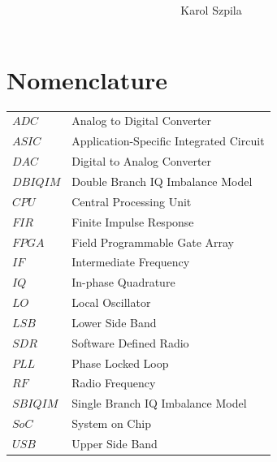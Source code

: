 \documentclass[en,printmode]{mgr}
\title{ }
\author{Karol Szpila}
\begin{document}

\maketitle %

\chapter*{Nomenclature}
\begin{table}[!htb]
\begin{tabular}{ll}
$ADC$  & Analog to Digital Converter   \\
$ASIC$ & Application-Specific Integrated Circuit \\
$DAC$  & Digital to Analog Converter   \\
$DBIQIM$ & Double Branch IQ Imbalance Model \\
$CPU$  & Central Processing Unit \\
$FIR$  & Finite Impulse Response \\ 
$FPGA$ & Field Programmable Gate Array \\
$IF$   & Intermediate Frequency \\
$IQ$   & In-phase Quadrature \\
$LO$   & Local Oscillator \\
$LSB$  & Lower Side Band \\
$SDR$  & Software Defined Radio \\
$PLL$  & Phase Locked Loop \\
$RF$   & Radio Frequency \\
$SBIQIM$ & Single Branch IQ Imbalance Model \\
$SoC$  & System on Chip   \\
$USB$  & Upper Side Band \\                  
\end{tabular}
\end{table}

\tableofcontents %

\let\cleardoublepage\clearpage %
\end{document}

